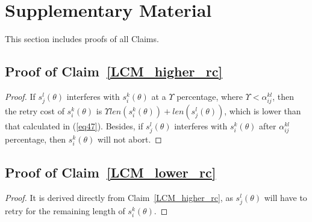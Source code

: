 \documentclass[letter]{sig-alternate}
\begin{document}

\small{}
\normalsize

\renewcommand{\thesubsection}{S.\arabic{subsection}}

\section*{Supplementary Material}

This section includes proofs of all Claims.
\subsection{\label{proof_LCM_higher_rc}Proof of Claim~\ref{LCM_higher_rc}}
\begin{proof}
If $s_{j}^{l}(\theta)$ interferes with $s_{i}^{k}(\theta)$
at a $\Upsilon$ percentage, where $\Upsilon<\alpha_{ij}^{kl}$,
then the retry cost of $s_{i}^{k}(\theta)$ is $\Upsilon len(s_{i}^{k}(\theta))+len(s_{j}^{l}(\theta))$, which is lower than that calculated in (\ref{eq47}). Besides, 
if $s_{j}^{l}(\theta)$ interferes with $s_{i}^{k}(\theta)$ after
$\alpha_{ij}^{kl}$ percentage, then $s_{i}^{k}(\theta)$ will not
abort.
\end{proof}
\subsection{\label{proof_LCM_lower_rc} Proof of Claim~\ref{LCM_lower_rc}}
\begin{proof}
It is derived directly from Claim~\ref{LCM_higher_rc}, as $s_j^l(\theta)$ will have to retry for the remaining length of $s_i^k(\theta)$.
\end{proof}
\end{document}
